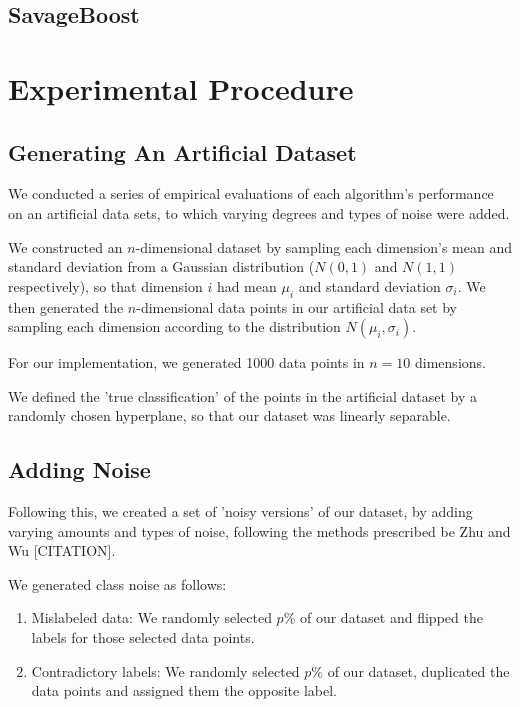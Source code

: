 \documentclass[11pt]{article}
\newcommand{\?}[0]{\vert}
\begin{document}
\subsection{SavageBoost}

\newpage
\section{Experimental Procedure}

\subsection{Generating An Artificial Dataset}
We conducted a series of empirical evaluations of each algorithm's performance on an artificial data sets, to which varying degrees and types of noise were added.

We constructed an $n$-dimensional dataset by sampling each dimension's mean and standard deviation from a Gaussian distribution ($N(0,1)$ and $N(1,1)$ respectively), so that dimension $i$ had mean $\mu_i$ and standard deviation $\sigma_i$. We then generated the $n$-dimensional data points in our artificial data set by sampling each dimension according to the distribution $N(\mu_i, \sigma_i)$.

For our implementation, we generated 1000 data points in $n=10$ dimensions.

We defined the 'true classification' of the points in the artificial dataset by a randomly chosen hyperplane, so that our dataset was linearly separable.

\subsection{Adding Noise}
Following this, we created a set of 'noisy versions' of our dataset, by adding varying amounts and types of noise, following the methods prescribed be Zhu and Wu [CITATION].

We generated class noise as follows:
\begin{enumerate}[1.]
\item Mislabeled data: We randomly selected $p\%$ of our dataset and flipped the labels for those selected data points.
\item Contradictory labels: We randomly selected $p\%$ of our dataset, duplicated the data points and assigned them the opposite label.
\end{enumerate}
\end{document}
